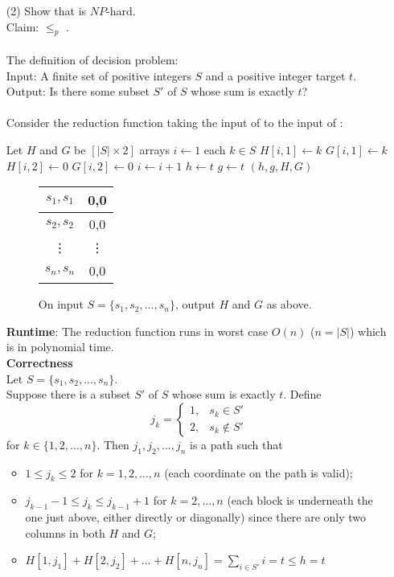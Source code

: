 \documentclass[11pt]{article}
\begin{document}
\begin{enumerate}
\item[(2)] Show that  is $NP$-hard.\\
Claim:  $\leq_p$ .\\
\\
The definition of  decision problem:\\
Input: A finite set of positive integers $S$ and a positive
    integer target $t$.\\
Output:    Is there some subset $S'$ of $S$ whose sum is exactly $t$?\\
\\
Consider the reduction function taking the input of  to the input of :
\begin{codebox}
\zi Let $H$ and $G$ be $[|S|\times 2]$ arrays
\zi $i \gets 1$
\zi \For each $k\in S$
\zi      \Then $H[i, 1] \gets k$
\zi            $G[i, 1] \gets k$
\zi            $H[i, 2] \gets 0$
\zi            $G[i, 2] \gets 0$
\zi            $i \gets i + 1$\End
\zi $h \gets t$
\zi $g \gets t$
\zi \Return $(h, g, H, G)$
\end{codebox}
   \begin{figure}[h]
    \centering
        \begin{tabular}{|c|c|}
        \hline
            $s_1, s_1$  & 0,0  \\
        \hline
            $s_2, s_2$  & 0,0  \\
        \hline
            \vdots  & \vdots  \\
        \hline
            $s_n, s_n$  & 0,0  \\
        \hline
        \end{tabular}
    \caption{On input $S = \{s_1, s_2, ..., s_n\}$, output $H$ and $G$ as above.}\label{fig:example}
    \end{figure}
{\bf Runtime}: The reduction function runs in worst case $O(n)$ ($n = |S|$) which is in polynomial time.\\
{\bf Correctness}\\
Let $S = \{s_1, s_2, ..., s_n\}$.\\
Suppose there is a subset $S'$ of $S$ whose sum is exactly $t$. Define
\[
j_k=
\begin{cases}
1, & s_k \in S'\\
2, & s_k \notin S'
\end{cases}
\] for $k\in \{1, 2, ..., n\}$.
Then $j_1, j_2, ..., j_n$ is a path such that
\begin{itemize}
        \item
            $1 \le j_k \le 2$ for $k = 1,2,\dots,n$
            (each coordinate on the path is valid);
        \item
            $j_{k-1} - 1 \le j_k \le j_{k-1} + 1$ for $k = 2,\dots,n$
            (each block is underneath the one just above,
            either directly or diagonally) since there are only two columns in both $H$ and $G$;
        \item
            $H[1,j_1] + H[2,j_2] + \dots + H[n,j_n] = \sum\limits_{i\in S'}i = t \leq h = t$


\end{itemize}
\end{enumerate}
\end{document}

